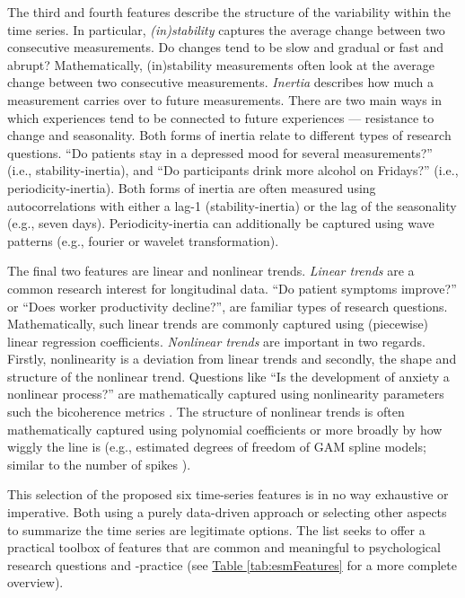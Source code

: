 \documentclass[man, 12pt, a4paper, mask]{apa7}
\theoremstyle{break}
\theoremstyle{plain}
\newcommand{\tblref}[2][]{\hyperref[#2]{Table \ref*{#2}#1}}
\begin{document}
The third and fourth features describe the structure of the variability within the time series. In particular, \textit{(in)stability} captures the average change between two consecutive measurements. Do changes tend to be slow and gradual or fast and abrupt? Mathematically, (in)stability measurements often look at the average change between two consecutive measurements. \textit{Inertia} describes how much a measurement carries over to future measurements. There are two main ways in which experiences tend to be connected to future experiences --- resistance to change and seasonality. Both forms of inertia relate to different types of research questions. ``Do patients stay in a depressed mood for several measurements?'' (i.e., stability-inertia), and ``Do participants drink more alcohol on Fridays?'' (i.e., periodicity-inertia). Both forms of inertia are often measured using autocorrelations with either a lag-1 (stability-inertia) or the lag of the seasonality (e.g., seven days). Periodicity-inertia can additionally be captured using wave patterns (e.g., fourier or wavelet transformation).

The final two features are linear and nonlinear trends. \textit{Linear trends} are a common research interest for longitudinal data. ``Do patient symptoms improve?'' or ``Does worker productivity decline?'', are familiar types of research questions. Mathematically, such linear trends are commonly captured using (piecewise) linear regression coefficients. \textit{Nonlinear trends} are important in two regards. Firstly, nonlinearity is a deviation from linear trends and secondly, the shape and structure of the nonlinear trend. Questions like ``Is the development of anxiety a nonlinear process?'' are mathematically captured using nonlinearity parameters such the bicoherence metrics \citep{cuddy2009}. The structure of nonlinear trends is often mathematically captured using polynomial coefficients or more broadly by how wiggly the line is (e.g., estimated degrees of freedom of GAM spline models; similar to the number of spikes \citealp[]{caro-martin2018}). 

This selection of the proposed six time-series features is in no way exhaustive or imperative. Both using a purely data-driven approach or selecting other aspects to summarize the time series are legitimate options. The list seeks to offer a practical toolbox of features that are common and meaningful to psychological research questions and -practice (see \tblref{tab:esmFeatures} for a more complete overview).
\end{document}
